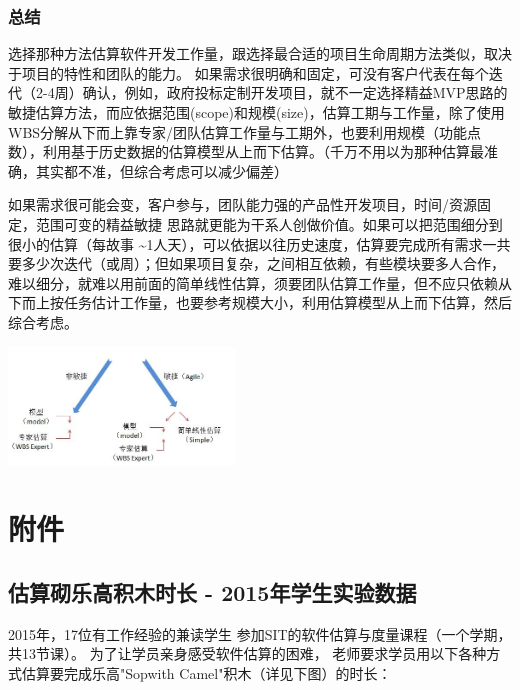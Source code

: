 \hypertarget{ux603bux7ed3}{%
\subsubsection{总结}\label{ux603bux7ed3}}

选择那种方法估算软件开发工作量，跟选择最合适的项目生命周期方法类似，取决于项目的特性和团队的能力。
如果需求很明确和固定，可没有客户代表在每个迭代（2-4周）确认，例如，政府投标定制开发项目，就不一定选择精益MVP思路的敏捷估算方法，而应依据范围(scope)和规模(size)，估算工期与工作量，除了使用WBS分解从下而上靠专家/团队估算工作量与工期外，也要利用规模（功能点数），利用基于历史数据的估算模型从上而下估算。（千万不用以为那种估算最准确，其实都不准，但综合考虑可以减少偏差）

如果需求很可能会变，客户参与，团队能力强的产品性开发项目，时间/资源固定，范围可变的精益敏捷
思路就更能为干系人创做价值。如果可以把范围细分到很小的估算（每故事
\textasciitilde{}1人天），可以依据以往历史速度，估算要完成所有需求一共要多少次迭代（或周）；但如果项目复杂，之间相互依赖，有些模块要多人合作，难以细分，就难以用前面的简单线性估算，须要团队估算工作量，但不应只依赖从下而上按任务估计工作量，也要参考规模大小，利用估算模型从上而下估算，然后综合考虑。


\includegraphics[width=6cm]{敏捷非敏捷1.jpg}\\

\hypertarget{ux9644ux4ef6}{%
\section{附件}\label{ux9644ux4ef6}}

\hypertarget{ux4f30ux7b97ux780cux4e50ux9ad8ux79efux6728ux65f6ux957f---2015ux5e74ux5b66ux751fux5b9eux9a8cux6570ux636e}{%
\subsection{估算砌乐高积木时长 -
2015年学生实验数据}\label{ux4f30ux7b97ux780cux4e50ux9ad8ux79efux6728ux65f6ux957f---2015ux5e74ux5b66ux751fux5b9eux9a8cux6570ux636e}}

2015年，17位有工作经验的兼读学生
参加SIT的软件估算与度量课程（一个学期，共13节课）。
为了让学员亲身感受软件估算的困难，
老师要求学员用以下各种方式估算要完成乐高"Sopwith
Camel"积木（详见下图）的时长：

